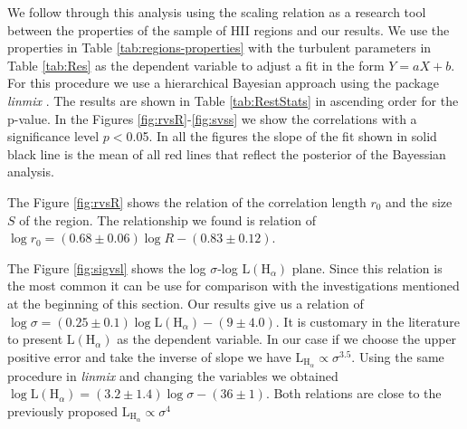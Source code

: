 \documentclass[fleqn,usenatbib, useAMS, a4paper]{mnras}
\begin{document}
We follow through this analysis using the scaling relation as a research tool between the properties of the sample of HII regions and our results. 
We use the properties in Table \ref{tab:regions-properties} with the turbulent parameters in Table \ref{tab:Res} as the dependent variable to adjust a fit in the form $Y = aX +b$. 
For this procedure we use a hierarchical Bayesian approach using the package \textit{linmix} \citep{2007ApJ...665.1489K}.
The results are shown in Table \ref{tab:RestStats} in ascending order for the p-value.
In the Figures \ref{fig:rvsR}-\ref{fig:svss} we show the correlations with a significance level  $p < $0.05.
In all the figures the slope of the fit shown in solid black line is the mean of all red lines that reflect the posterior of the Bayessian analysis.

The Figure \ref{fig:rvsR} shows the relation of the correlation length $r_0$ and the size \(S\) of the region. The relationship we found is relation of \(\log r_0 = (0.68 \pm 0.06) \log R-(0.83 \pm 0.12)\).

The Figure \ref{fig:sigvsl} shows the log \(\sigma\)-log $\text{L}(\text{H}_{\alpha})$ plane.
Since this relation is the most common it can be use for comparison with the investigations mentioned at the beginning of this section.
Our results give us a relation of $\log \sigma = (0.25 \pm 0.1) \log \text{L}(\text{H}_{\alpha})-(9 \pm 4.0)$.
It is customary in the literature to present $\text{L} (\text{H}_{\alpha})$ as the dependent variable.
In our case if we choose the upper positive error and take the inverse of slope we have \(\text{L}_{\text{H}_{\alpha}} \propto \sigma^{3.5}\). 
Using the same procedure in \textit{linmix} and changing the variables we obtained $\log \text{L}(\text{H}_{\alpha}) = (3.2\pm 1.4) \log \sigma -(36 \pm 1)$.
Both relations are close to the previously proposed \(\text{L}_{\text{H}_{\alpha}} \propto \sigma^{4}\)



\end{document}
